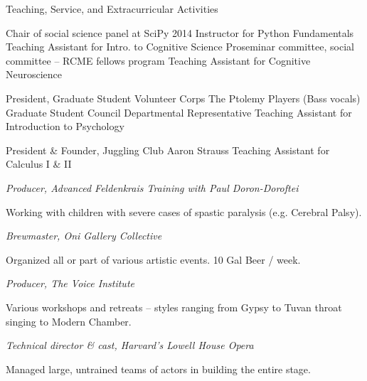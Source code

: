 \begin{rubric}{Teaching, Service, and Extracurricular Activities}

\entry*[2014] Chair of social science panel at SciPy 2014
\entry*[2013] Instructor for Python Fundamentals
\entry*[2012] Teaching Assistant for Intro. to Cognitive Science
\entry*[2010--2012] Proseminar committee, social committee -- RCME fellows program
\entry*[2007] Teaching Assistant for Cognitive Neuroscience

\entry*[2001--2002] President, Graduate Student Volunteer Corps
\entry*[2001--2002] The Ptolemy Players (Bass vocals)
\entry*[2001] Graduate Student Council Departmental Representative
\entry*[2000] Teaching Assistant for Introduction to Psychology

\entry*[1996--1999] President \& Founder, Juggling Club
\entry*[1996--1997] Aaron Strauss Teaching Assistant for Calculus I \& II

\entry*[2004] \emph{Producer, Advanced Feldenkrais Training with Paul Doron-Doroftei}
\par Working with children with severe cases of spastic paralysis (e.g. Cerebral
Palsy).

\entry*[2003] \emph{Brewmaster, Oni Gallery Collective}
\par Organized all or part of various artistic events.  10 Gal Beer / week.

\entry*[2001-2003] \emph{Producer, The Voice Institute}
\par Various workshops and retreats -- styles ranging from Gypsy to Tuvan throat
singing to Modern Chamber.

\entry*[2003] \emph{Technical director \& cast, Harvard's Lowell House Opera}
\par Managed large, untrained teams of actors in building the entire stage.


\end{rubric}
